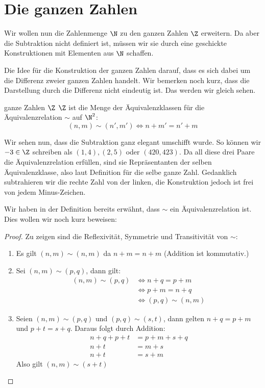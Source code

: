 \section{Die ganzen Zahlen}
Wir wollen nun die Zahlenmenge $\N$ zu den ganzen Zahlen $\Z$ erweitern. Da aber die Subtraktion nicht definiert ist, müssen wir sie durch eine geschickte Konstruktionen mit Elementen aus $\N$ schaffen.

Die Idee für die Konstruktion der ganzen Zahlen darauf, dass es sich dabei um die Differenz zweier ganzen Zahlen handelt. Wir bemerken noch kurz, dass die Darstellung durch die Differenz nicht eindeutig ist. Das werden wir gleich sehen.
\begin{definition}{ganze Zahlen $\Z$}{}
$\Z$ ist die Menge der Äquivalenzklassen für die Äquivalenzrelation $\sim$ auf $\N^2$:
$$(n,m) \sim (n',m') \iff n + m' = n' + m$$
\end{definition}
Wir sehen nun, dass die Subtraktion ganz elegant umschifft wurde. So können wir $-3 \in \Z$ schreiben als $(1, 4), (2, 5)$ oder $(420, 423)$. Da all diese drei Paare die Äquivalenzrelation erfüllen, sind sie Repräsentanten der selben Äquivalenzklasse, also laut Definition für die selbe ganze Zahl. Gedanklich subtrahieren wir die rechte Zahl von der linken, die Konstruktion jedoch ist frei von jedem Minus-Zeichen.

Wir haben in der Definition bereits erwähnt, dass $\sim$ ein Äquivalenzrelation ist. Dies wollen wir noch kurz beweisen:
\begin{proof} Zu zeigen sind die Reflexivität, Symmetrie und Transitivität von $\sim$:
\begin{enumerate}
    \item Es gilt $(n, m) \sim (n, m)$ da $n + m = n + m$ (Addition ist kommutativ.)
    \item Sei $(n, m) \sim (p, q)$, dann gilt:
    \begin{align*}
        (n, m) \sim (p, q)  &\iff n + q = p + m\\
                            &\iff p + m = n + q\\
                            &\iff (p, q) \sim (n, m)
    \end{align*}
    \item Seien $(n, m) \sim (p, q)$ und $(p, q) \sim (s, t)$, dann gelten $n + q = p + m$ und $p + t = s + q$. Daraus folgt durch Addition:
    \begin{align*}
     n + q + p + t &= p + m + s + q\\
        n + t &= m + s\\
        n + t &= s + m
    \end{align*}
    Also gilt $(n, m) \sim (s + t)$
\end{enumerate}
\end{proof}


